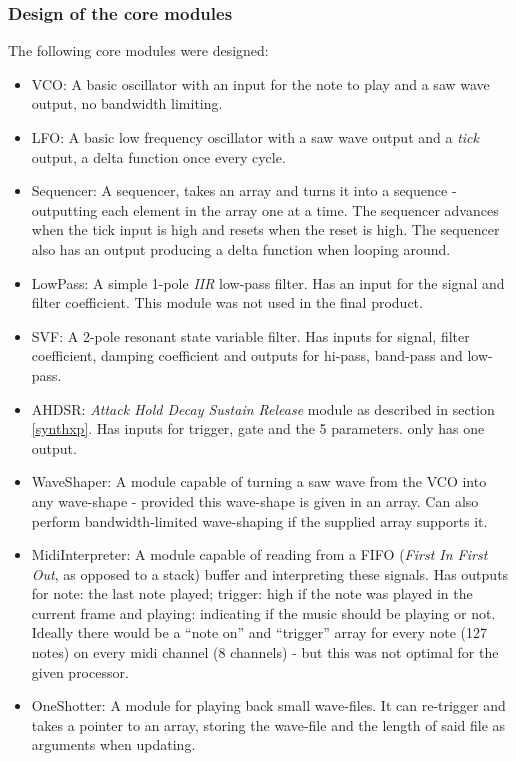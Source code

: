 \subsubsection{Design of the core modules}
The following core modules were designed:
\begin{itemize}
  \item VCO: A basic oscillator with an input for the note to play and a saw
  wave output, no bandwidth limiting.
  \item LFO: A basic low frequency oscillator with a saw wave output and a
  \emph{tick} output, a delta function once every cycle.
  \item Sequencer: A sequencer, takes an array and turns it into a sequence -
  outputting each element in the array one at a time. The sequencer advances
  when the tick input is high and resets when the reset is high. The sequencer
  also has an output producing a delta function when looping around.
  \item LowPass: A simple 1-pole \emph{IIR} low-pass filter. Has an input for
  the signal and filter coefficient. This module was not used in the final product.
  \item SVF: A 2-pole resonant state variable filter. Has inputs for signal,
  filter coefficient, damping coefficient and outputs for hi-pass, band-pass and
  low-pass.
  \item AHDSR: \emph{Attack Hold Decay Sustain Release} module as described in
  section \ref{synthxp}. Has inputs for trigger, gate and the 5 parameters. only
  has one output.
  \item WaveShaper: A module capable of turning a saw wave from the VCO into any
  wave-shape - provided this wave-shape is given in an array. Can also perform
  bandwidth-limited wave-shaping if the supplied array supports it.
  \item MidiInterpreter: A module capable of reading from a FIFO (\emph{First
  In First Out}, as opposed to a stack) buffer and interpreting these signals.
  Has outputs for note: the last note played; trigger: high if the note was
  played in the current frame and playing: indicating if the music should be
  playing or not. Ideally there would be a ``note on'' and ``trigger'' array for
  every note (127 notes) on every midi channel (8 channels) - but this was not
  optimal for the given processor.
  \item OneShotter: A module for playing back small wave-files. It can
  re-trigger and takes a pointer to an array, storing the wave-file and the
  length of said file as arguments when updating.
\end{itemize}

